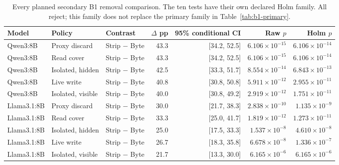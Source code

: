 \begin{table}[t]\centering\small
\caption{Every planned secondary B1 removal comparison. The ten tests have their own declared Holm family. All reject; this family does not replace the primary family in Table~\ref{tab:b1-primary}.}\label{tab:b1-removal}
\setlength{\tabcolsep}{4pt}
\begin{tabularx}{\textwidth}{@{}lP{.12\textwidth}Yrrrr@{}}\toprule
Model & Policy & Contrast & $\Delta$ pp & 95\% conditional CI & Raw $p$ & Holm $p$ \\\midrule
Qwen3:8B & Proxy discard & Strip $-$ Byte & 43.3 & [34.2, 52.5] & $6.106\times10^{-15}$ & $6.106\times10^{-14}$ \\
Qwen3:8B & Read cover & Strip $-$ Byte & 43.3 & [34.2, 52.5] & $6.106\times10^{-15}$ & $6.106\times10^{-14}$ \\
Qwen3:8B & Isolated, hidden & Strip $-$ Byte & 42.5 & [33.3, 51.7] & $8.554\times10^{-14}$ & $6.843\times10^{-13}$ \\
Qwen3:8B & Live write & Strip $-$ Byte & 40.8 & [30.8, 50.8] & $5.911\times10^{-12}$ & $2.955\times10^{-11}$ \\
Qwen3:8B & Isolated, visible & Strip $-$ Byte & 40.0 & [30.8, 49.2] & $2.919\times10^{-12}$ & $1.751\times10^{-11}$ \\
Llama3.1:8B & Proxy discard & Strip $-$ Byte & 30.0 & [21.7, 38.3] & $2.838\times10^{-10}$ & $1.135\times10^{-9}$ \\
Llama3.1:8B & Read cover & Strip $-$ Byte & 33.3 & [25.0, 41.7] & $1.819\times10^{-12}$ & $1.273\times10^{-11}$ \\
Llama3.1:8B & Isolated, hidden & Strip $-$ Byte & 25.0 & [17.5, 33.3] & $1.537\times10^{-8}$ & $4.610\times10^{-8}$ \\
Llama3.1:8B & Live write & Strip $-$ Byte & 26.7 & [18.3, 35.8] & $6.678\times10^{-8}$ & $1.336\times10^{-7}$ \\
Llama3.1:8B & Isolated, visible & Strip $-$ Byte & 21.7 & [13.3, 30.0] & $6.165\times10^{-6}$ & $6.165\times10^{-6}$ \\
\bottomrule\end{tabularx}\end{table}
